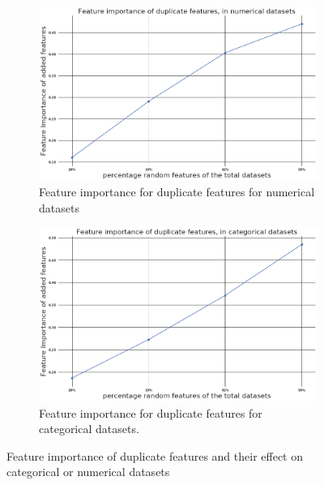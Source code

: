 \documentclass[a4paper,10pt]{article}
\begin{document}
\begin{figure}[H]
	\centering
	\begin{subfigure}[b]{0.40\textwidth}
		\includegraphics[width=\textwidth]{images/MetaFeatures/FeatureImportanceNum.png}
		\caption{Feature importance for duplicate features for numerical datasets}
		\label{fig:FIDN}
	\end{subfigure}
	\begin{subfigure}[b]{0.45\textwidth}
		\includegraphics[width=\textwidth]{images/MetaFeatures/FeatureImportanceCat.png}
		\caption{Feature importance for duplicate features for categorical datasets.}
		\label{fig:FIDC}
	\end{subfigure}
	\caption{Feature importance of duplicate features and their effect on categorical or numerical datasets}\label{fig:FID}
\end{figure}
\end{document}

